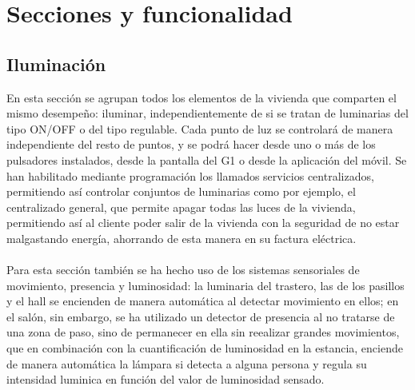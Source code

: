 \section{Secciones y funcionalidad}

\subsection{Iluminación}En esta sección se agrupan todos los elementos de la vivienda que comparten el mismo desempeño: iluminar, independientemente de si se tratan de luminarias del tipo ON/OFF o del tipo regulable. Cada punto de luz se controlará de manera independiente del resto de puntos, y se podrá hacer desde uno o más de los pulsadores instalados, desde la pantalla del G1 o desde la aplicación del móvil. Se han habilitado mediante programación los llamados servicios centralizados, permitiendo así controlar conjuntos de luminarias como por ejemplo, el centralizado general, que permite apagar todas las luces de la vivienda, permitiendo así al cliente poder salir de la vivienda con la seguridad de no estar malgastando energía, ahorrando de esta manera en su factura eléctrica. \\\\ Para esta sección también se ha hecho uso de los sistemas sensoriales de movimiento, presencia y luminosidad: la luminaria del trastero, las de los pasillos y el hall se encienden de manera automática al detectar movimiento en ellos; en el salón, sin embargo, se ha utilizado un detector de presencia al no tratarse de una zona de paso, sino de permanecer en ella sin reealizar grandes movimientos, que en combinación con la cuantificación de luminosidad en la estancia, enciende de manera automática la lámpara si detecta a alguna persona y regula su intensidad luminica en función del valor de luminosidad sensado.\\

